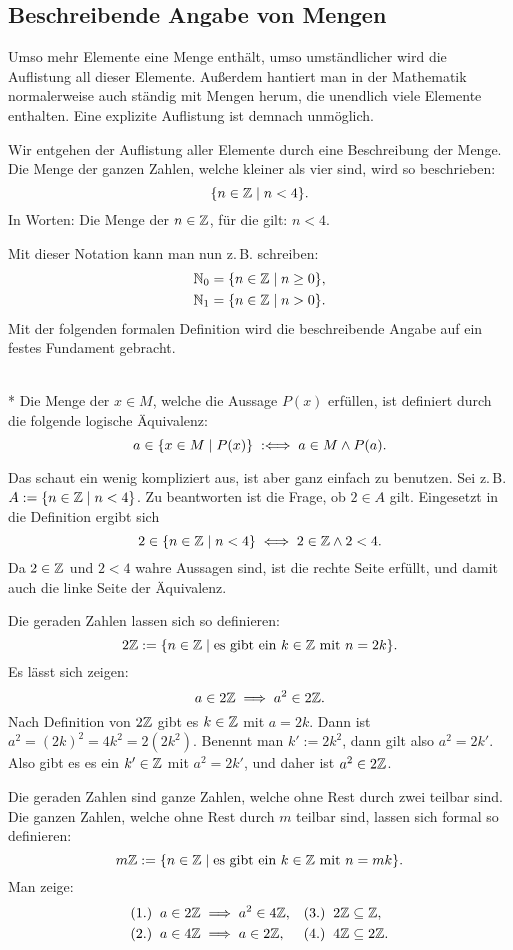 \subsection{Beschreibende Angabe von Mengen}

Umso mehr Elemente eine Menge enthält, umso umständlicher wird
die Auflistung all dieser Elemente. Außerdem hantiert man in der
Mathematik normalerweise auch ständig mit Mengen herum, die
unendlich viele Elemente enthalten. Eine explizite Auflistung ist
demnach unmöglich.

Wir entgehen der Auflistung aller Elemente durch eine Beschreibung
der Menge. Die Menge der ganzen Zahlen, welche kleiner als vier sind,
wird so beschrieben:%
\[\{n\in\mathbb Z\mid n<4\}.\]
In Worten: Die Menge der $n\in\mathbb Z$, für die gilt: $n<4$.

Mit dieser Notation kann man nun z.\,B. schreiben:%
\begin{align*}
\mathbb N_0 &= \{n\in\mathbb Z\mid n\ge 0\},\\
\mathbb N_1 &= \{n\in\mathbb Z\mid n>0\}.
\end{align*}
Mit der folgenden formalen Definition wird die beschreibende Angabe
auf ein festes Fundament gebracht.

\begin{Definition}%
\label{def:set-builder-bounded}\mbox{}\\*
Die Menge der $x\in M$, welche die Aussage $P(x)$ erfüllen,
ist definiert durch die folgende logische Äquivalenz:%
\[a\in\{x\in M\mid P(x)\} \;:\Longleftrightarrow\; a\in M\land P(a).\]
\end{Definition}
Das schaut ein wenig kompliziert aus, ist aber ganz einfach zu
benutzen. Sei z.\,B. $A:=\{n\in\mathbb Z\mid n<4\}$. Zu beantworten ist
die Frage, ob $2\in A$ gilt. Eingesetzt in die Definition
ergibt sich%
\[2\in\{n\in\mathbb Z\mid n<4\}\iff 2\in\mathbb Z\land 2<4.\]
Da $2\in\mathbb Z$ und $2<4$ wahre Aussagen sind, ist die rechte Seite
erfüllt, und damit auch die linke Seite der Äquivalenz.

Die geraden Zahlen lassen sich so definieren:%
\[2\mathbb Z:=\{n\in\mathbb Z\mid\text{es gibt ein $k\in\mathbb Z$ mit $n=2k$}\}.\]
Es lässt sich zeigen:
\[a\in 2\mathbb Z\implies a^2\in 2\mathbb Z.\]
Nach Definition von $2\mathbb Z$ gibt es $k\in\mathbb Z$ mit $a=2k$.
Dann ist $a^2=(2k)^2=4k^2=2(2k^2)$. Benennt man $k':=2k^2$, dann
gilt also $a^2=2k'$. Also gibt es es ein $k'\in\mathbb Z$
mit $a^2=2k'$, und daher ist $a^2\in 2\mathbb Z$.

Die geraden Zahlen sind ganze Zahlen, welche ohne Rest durch zwei
teilbar sind. Die ganzen Zahlen, welche ohne Rest durch $m$ teilbar
sind, lassen sich formal so definieren:%
\[m\mathbb Z:=\{n\in\mathbb Z\mid\text{es gibt ein $k\in\mathbb Z$ mit $n=mk$}\}.\]
Man zeige:
\begin{align*}
& (1.)\;\;a\in 2\mathbb Z\implies a^2\in 4\mathbb Z, && (3.)\;\;2\mathbb Z\subseteq\mathbb Z,\\
& (2.)\;\;a\in 4\mathbb Z\implies a\in 2\mathbb Z,   && (4.)\;\;4\mathbb Z\subseteq 2\mathbb Z.
\end{align*}


